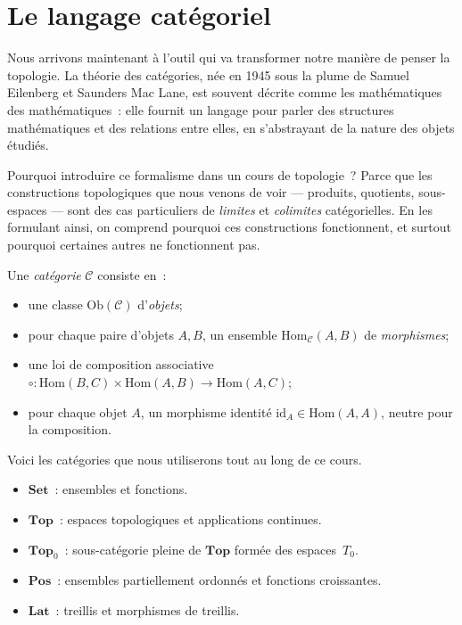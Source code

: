 \section{Le langage cat\'egoriel}

Nous arrivons maintenant \`a l'outil qui va transformer notre mani\`ere de
penser la topologie. La th\'eorie des cat\'egories, n\'ee en 1945 sous la plume
de Samuel Eilenberg et Saunders Mac Lane, est souvent d\'ecrite comme
\og les math\'ematiques des math\'ematiques\fg~: elle fournit un langage pour
parler des structures math\'ematiques et des relations entre elles, en
s'abstrayant de la nature des objets \'etudi\'es.

Pourquoi introduire ce formalisme dans un cours de topologie~? Parce que
les constructions topologiques que nous venons de voir --- produits,
quotients, sous-espaces --- sont des cas particuliers de \emph{limites} et
\emph{colimites} cat\'egorielles. En les formulant ainsi, on comprend
pourquoi ces constructions fonctionnent, et surtout pourquoi certaines
autres ne fonctionnent pas.

\begin{definition}
Une \emph{cat\'egorie} $\mathcal{C}$ consiste en~:
\begin{itemize}
  \item une classe $\mathrm{Ob}(\mathcal{C})$ d'\emph{objets};
  \item pour chaque paire d'objets $A,B$, un ensemble $\mathrm{Hom}_{\mathcal{C}}(A,B)$
    de \emph{morphismes};
  \item une loi de composition associative
    $\circ\colon \mathrm{Hom}(B,C) \times \mathrm{Hom}(A,B) \to \mathrm{Hom}(A,C)$;
  \item pour chaque objet $A$, un morphisme identit\'e $\mathrm{id}_A \in \mathrm{Hom}(A,A)$,
    neutre pour la composition.
\end{itemize}
\end{definition}

Voici les cat\'egories que nous utiliserons tout au long de ce cours.

\begin{exemple}
\begin{itemize}
  \item $\mathbf{Set}$~: ensembles et fonctions.
  \item $\mathbf{Top}$~: espaces topologiques et applications continues.
  \item $\mathbf{Top}_0$~: sous-cat\'egorie pleine de $\mathbf{Top}$ form\'ee des
    espaces~$T_0$.
  \item $\mathbf{Pos}$~: ensembles partiellement ordonn\'es et fonctions croissantes.
  \item $\mathbf{Lat}$~: treillis et morphismes de treillis.
\end{itemize}
\end{exemple}

